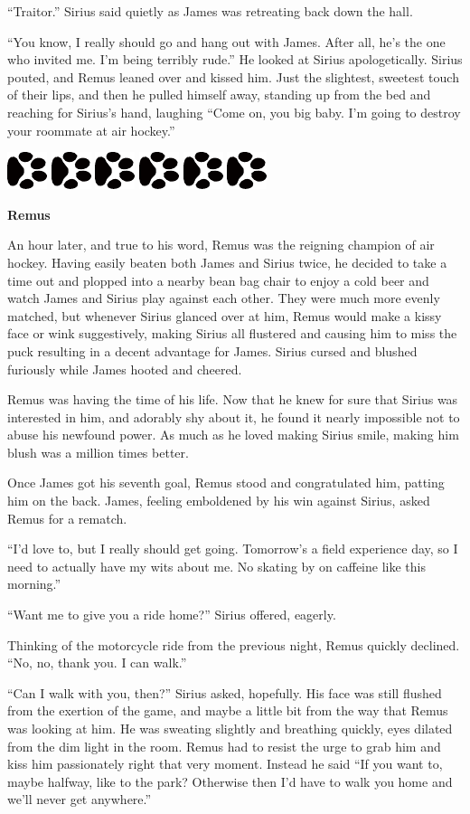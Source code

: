 \documentclass[12pt,twoside,openright]{memoir}
\newcommand{\dogPrintRule}{	
	\begin{center}
		\hspace{.5em}
		\includegraphics[angle=60]{dogprint.pdf}
		\hspace{.5em}
		\includegraphics[angle=120]{dogprint.pdf}
		\hspace{.5em}
		\includegraphics[angle=60]{dogprint.pdf}
		\hspace{.5em}
		\includegraphics[angle=120]{dogprint.pdf}
		\hspace{.5em}
		\includegraphics[angle=60]{dogprint.pdf}
		\hspace{.5em}
		\includegraphics[angle=120]{dogprint.pdf}
		\hspace{.5em}
	\end{center}
}
\begin{document}
``Traitor.'' Sirius said quietly as James was retreating back down the hall.

``You know, I really should go and hang out with James. After all, he's the one who invited me. I'm being terribly rude.''
He looked at Sirius apologetically. Sirius pouted, and Remus leaned over and kissed him. Just the slightest, sweetest touch of their lips, and then he pulled himself away, standing up from the bed and reaching for Sirius's hand, laughing
``Come on, you big baby. I'm going to destroy your roommate at air hockey.''

\dogPrintRule

\textbf{Remus} 

An hour later, and true to his word, Remus was the reigning champion of air hockey. Having easily beaten both James and Sirius twice, he decided to take a time out and plopped into a nearby bean bag chair to enjoy a cold beer and watch James and Sirius play against each other. They were much more evenly matched, but whenever Sirius glanced over at him, Remus would make a kissy face or wink suggestively, making Sirius all flustered and causing him to miss the puck resulting in a decent advantage for James. Sirius cursed and blushed furiously while James hooted and cheered.

Remus was having the time of his life. Now that he knew for sure that Sirius was interested in him, and adorably shy about it, he found it nearly impossible not to abuse his newfound power. As much as he loved making Sirius smile, making him blush was a million times better.

Once James got his seventh goal, Remus stood and congratulated him, patting him on the back. James, feeling emboldened by his win against Sirius, asked Remus for a rematch.

``I'd love to, but I really should get going. Tomorrow's a field experience day, so I need to actually have my wits about me. No skating by on caffeine like this morning.''

``Want me to give you a ride home?'' Sirius offered, eagerly.

Thinking of the motorcycle ride from the previous night, Remus quickly declined. ``No, no, thank you. I can walk.''

``Can I walk with you, then?'' Sirius asked, hopefully. His face was still flushed from the exertion of the game, and maybe a little bit from the way that Remus was looking at him. He was sweating slightly and breathing quickly, eyes dilated from the dim light in the room. Remus had to resist the urge to grab him and kiss him passionately right that very moment. Instead he said ``If you want to, maybe halfway, like to the park? Otherwise then I'd have to walk you home and we'll never get anywhere.''
\end{document}
